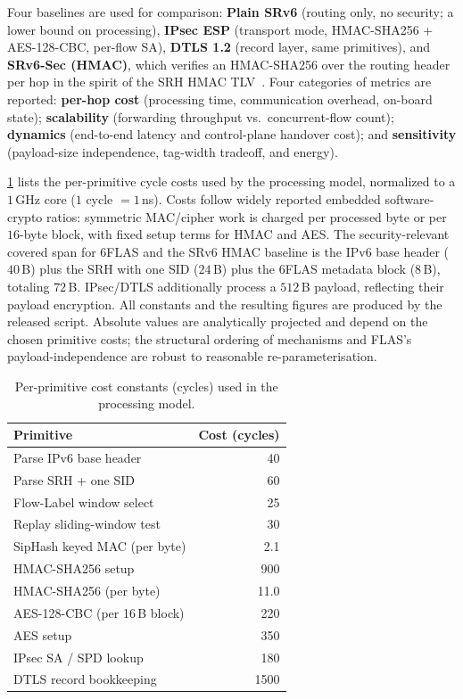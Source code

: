 Four baselines are used for comparison: \textbf{Plain SRv6} (routing only, no
security; a lower bound on processing), \textbf{IPsec ESP} (transport mode,
HMAC-SHA256 + AES-128-CBC, per-flow SA), \textbf{DTLS 1.2} (record layer, same
primitives), and \textbf{SRv6-Sec (HMAC)}, which verifies an HMAC-SHA256 over
the routing header per hop in the spirit of the SRH HMAC TLV~\cite{rfc8754}.
Four categories of metrics are reported: \textbf{per-hop cost} (processing time,
communication overhead, on-board state); \textbf{scalability} (forwarding
throughput vs.\ concurrent-flow count); \textbf{dynamics} (end-to-end latency
and control-plane handover cost); and \textbf{sensitivity} (payload-size
independence, tag-width tradeoff, and energy).

\cref{tab:cyc} lists the per-primitive cycle costs used by the processing model,
normalized to a $1$\,GHz core ($1$ cycle $=1$\,ns). Costs follow widely reported
embedded software-crypto ratios: symmetric MAC/cipher work is charged per
processed byte or per $16$-byte block, with fixed setup terms for HMAC and AES.
The security-relevant covered span for 6FLAS and the SRv6 HMAC baseline is the
IPv6 base header ($40$\,B) plus the SRH with one SID ($24$\,B) plus the 6FLAS
metadata block ($8$\,B), totaling $72$\,B. IPsec/DTLS additionally process a
$512$\,B payload, reflecting their payload encryption. All constants and the
resulting figures are produced by the released script.
Absolute values are analytically projected and depend on the chosen primitive costs;
the structural ordering of mechanisms and FLAS's payload-independence are robust
to reasonable re-parameterisation.

\begin{table}[t]
\centering
\caption{Per-primitive cost constants (cycles) used in the processing model.}
\label{tab:cyc}
\renewcommand{\arraystretch}{1.15}
\begin{tabular}{lr}
\toprule
\textbf{Primitive} & \textbf{Cost (cycles)} \\
\midrule
Parse IPv6 base header        & 40 \\
Parse SRH + one SID           & 60 \\
Flow-Label window select      & 25 \\
Replay sliding-window test    & 30 \\
SipHash keyed MAC (per byte)  & 2.1 \\
HMAC-SHA256 setup             & 900 \\
HMAC-SHA256 (per byte)        & 11.0 \\
AES-128-CBC (per 16\,B block) & 220 \\
AES setup                     & 350 \\
IPsec SA / SPD lookup         & 180 \\
DTLS record bookkeeping       & 1500 \\
\bottomrule
\end{tabular}
\end{table}

